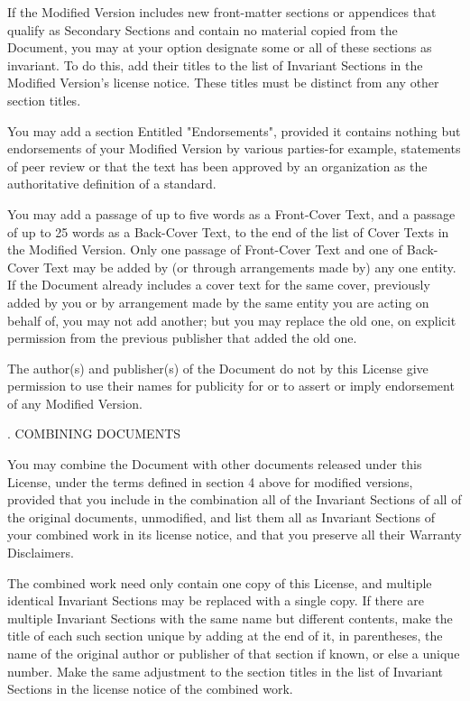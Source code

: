 If the Modified Version includes new front-matter sections or appendices that qualify as Secondary Sections and contain no material copied from the Document, you may at your option designate some or all of these sections as invariant. To do this, add their titles to the list of Invariant Sections in the Modified Version's license notice. These titles must be distinct from any other section titles.

You may add a section Entitled "Endorsements", provided it contains nothing but endorsements of your Modified Version by various parties-for example, statements of peer review or that the text has been approved by an organization as the authoritative definition of a standard.

You may add a passage of up to five words as a Front-Cover Text, and a passage of up to 25 words as a Back-Cover Text, to the end of the list of Cover Texts in the Modified Version. Only one passage of Front-Cover Text and one of Back-Cover Text may be added by (or through arrangements made by) any one entity. If the Document already includes a cover text for the same cover, previously added by you or by arrangement made by the same entity you are acting on behalf of, you may not add another; but you may replace the old one, on explicit permission from the previous publisher that added the old one.

The author(s) and publisher(s) of the Document do not by this License give permission to use their names for publicity for or to assert or imply endorsement of any Modified Version.

. COMBINING DOCUMENTS

You may combine the Document with other documents released under this License, under the terms defined in section 4 above for modified versions, provided that you include in the combination all of the Invariant Sections of all of the original documents, unmodified, and list them all as Invariant Sections of your combined work in its license notice, and that you preserve all their Warranty Disclaimers.

The combined work need only contain one copy of this License, and multiple identical Invariant Sections may be replaced with a single copy. If there are multiple Invariant Sections with the same name but different contents, make the title of each such section unique by adding at the end of it, in parentheses, the name of the original author or publisher of that section if known, or else a unique number. Make the same adjustment to the section titles in the list of Invariant Sections in the license notice of the combined work.

